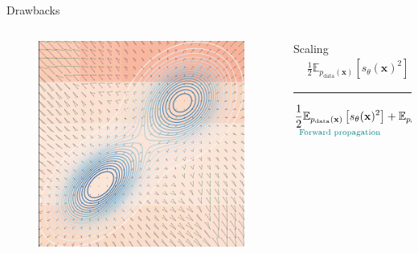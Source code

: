 \documentclass[aspectratio=169,xcolor=dvipsnames]{beamer}
\newcommand{\bx}{\mathbf{x}}
\newcommand{\nbx}{\nabla_{\bx}}
\begin{document}
\begin{frame}{Drawbacks}
\begin{columns}
\begin{column}{0.4\textwidth}
        \begin{figure}
          \centering
        \includegraphics[height=0.32\textheight]{figs/gen/score_field_training_final}
      \end{figure}
    \end{column}
    \pause
    \begin{column}{0.6\textwidth}
      \centering
      Scaling
      \pause
      \centering
      \begin{align*}
        &\frac{1}{2}\mathbb{E}_{p_\text{data}(\bx)} \left[ s_\theta(\bx)^2\right] + \mathbb{E}_{p_\text{data}(\bx)}\left[\nbx s_\theta(\bx) \right]
      \end{align*}
      \pause
      
      \rule{0.8\textwidth}{0.4pt}
      
      \begin{align*}
        \underset{
          \textcolor{teal}{\text{Forward propagation}}
        }{ \frac{1}{2}\mathbb{E}_{p_\text{data}(\bx)} \left[ s_\theta(\bx)^2\right]} 
        + \underset{
          \textcolor{red}{\text{Backprops}~\propto~\text{dim}(\bx)}
        }{\mathbb{E}_{p_\text{data}(\bx)}\left[\text{trace}(\nbx s_\theta(\bx)) \right]}
      \end{align*}
    \end{column}
  \end{columns}
\end{frame}
\end{document}
